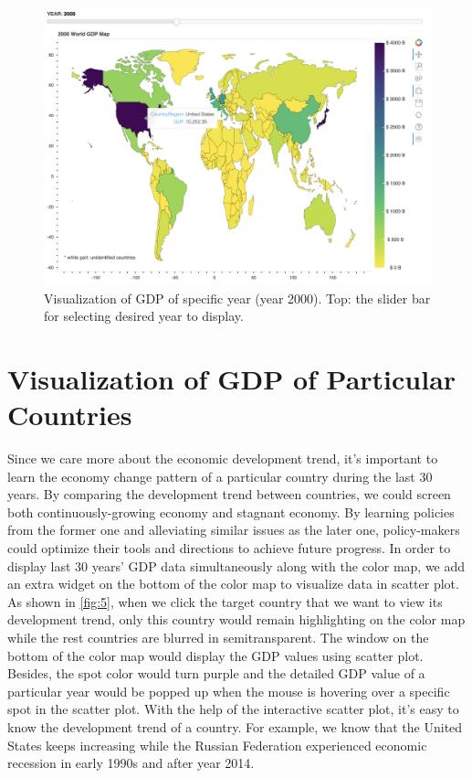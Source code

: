 \documentclass{vgtc}                          %
\begin{document}
\begin{figure}[!tb]
  \centering
  \includegraphics[width=\columnwidth]{hover_slider.png}
  \caption{Visualization of GDP of specific year (year 2000). Top: the slider bar for selecting desired year to display.}
  \label{fig:4}
\end{figure}

\section{Visualization of GDP of Particular Countries}
Since we care more about the economic development trend, it's important to learn the economy change pattern of a particular country during the last 30 years. By comparing the development trend between countries, we could screen both continuously-growing economy and stagnant economy. By learning policies from the former one and alleviating similar issues as the later one, policy-makers could optimize their tools and directions to achieve future progress. In order to display last 30 years' GDP data simultaneously along with the color map, we add an extra widget on the bottom of the color map to visualize data in scatter plot. As shown in \autoref{fig:5}, when we click the target country that we want to view its development trend, only this country would remain highlighting on the color map while the rest countries are blurred in semitransparent. The window on the bottom of the color map would display the GDP values using scatter plot. Besides, the spot color would turn purple and the detailed GDP value of a particular year would be popped up when the mouse is hovering over a specific spot in the scatter plot. With the help of the interactive scatter plot, it's easy to know the development trend of a country. For example, we know that the United States keeps increasing while the Russian Federation experienced economic recession in early 1990s and after year 2014. 
\end{document}
